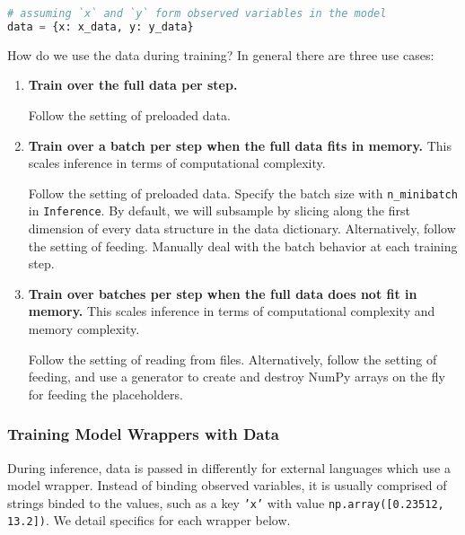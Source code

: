 \begin{lstlisting}[language=Python]
# assuming `x` and `y` form observed variables in the model
data = {x: x_data, y: y_data}
\end{lstlisting}


How do we use the data during training? In general there are three use
cases:

\begin{enumerate}
\item
\textbf{Train over the full data per step.}

Follow the setting of preloaded data.
\item
\textbf{Train over a batch per step when the full data fits in memory.} This
scales inference in terms of computational complexity.

Follow the setting of preloaded data. Specify the batch size with
\texttt{n_minibatch} in \texttt{Inference}. By default, we will subsample by
slicing along the first dimension of every data structure in the
data dictionary. Alternatively, follow the setting of feeding.
Manually deal with the batch behavior at each training step.
\item
\textbf{Train over batches per step when the full data does not fit in
memory.} This scales inference in terms of computational complexity and
memory complexity.

Follow the setting of reading from files. Alternatively, follow the
setting of feeding, and use a generator to create and destroy NumPy
arrays on the fly for feeding the placeholders.
\end{enumerate}


\subsubsection{Training Model Wrappers with Data}

During inference, data is passed in differently for external
languages which use a model wrapper. Instead of binding observed
variables, it is usually comprised
of strings binded to the values, such as a key \texttt{'x'} with value
\texttt{np.array([0.23512, 13.2])}.
We detail specifics for each wrapper below.


